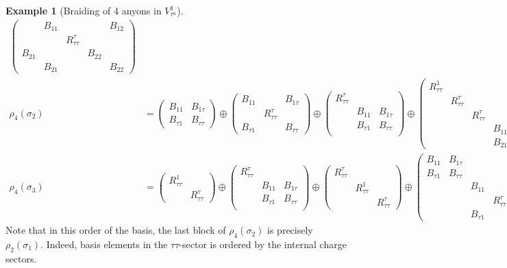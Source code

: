 \documentclass[a4paper,10pt,oneside]{book}
\theoremstyle{plain}
\theoremstyle{definition}
\newtheorem{example}{Example}[section]
\theoremstyle{remark}
\begin{document}
\begin{example}[Braiding of 4 anyons in $V_{τ^n}^1$]
{\begin{align*}
\begin{pmatrix}
             & B_{11}            &                   &        & B_{12} \\
             &                   & R_{ττ}^τ \\
      B_{21} &                   &                   & B_{22} & \\
             & B_{21}            &                   &        & B_{22}
    \end{pmatrix} \\
    ρ_4(σ_2) &=
    \begin{pmatrix}
      B_{11} & B_{1τ} \\
      B_{τ1} & B_{ττ}
    \end{pmatrix}
    \oplus
    \begin{pmatrix}
      B_{11} & & B_{1τ} \\
      & R_{ττ}^τ \\
      B_{τ1} & & B_{ττ}
    \end{pmatrix}
    \oplus
    \begin{pmatrix}
      R_{ττ}^τ \\
      & B_{11} & B_{1τ} \\
      & B_{τ1} & B_{ττ} \\
    \end{pmatrix}
    \oplus
    \begin{pmatrix}
      R_{ττ}^1 \\
      & R_{ττ}^τ \\
      & & R_{ττ}^τ \\
      & & & B_{11} & B_{12} \\
      & & & B_{21} & B_{22}
    \end{pmatrix} \\
    ρ_4(σ_3) &=
    \begin{pmatrix}
      R_{ττ}^1 \\
      & R_{ττ}^τ
    \end{pmatrix}
    \oplus
    \begin{pmatrix}
      R_{ττ}^τ \\
      & B_{11} & B_{1τ} \\
      & B_{τ1} & B_{ττ} \\
    \end{pmatrix}
    \oplus
    \begin{pmatrix}
      R_{ττ}^τ \\
      & R_{ττ}^1 \\
      & & R_{ττ}^τ
    \end{pmatrix}
    \oplus
    \begin{pmatrix}
      B_{11} & B_{1τ} \\
      B_{τ1} & B_{ττ} \\
      & & B_{11} & & B_{1τ} \\
      & & & R_{ττ}^τ \\
      & & B_{τ1} & & B_{ττ}
    \end{pmatrix}
  \end{align*}}
  Note that in this order of the basis, the last block of $ρ_{4}(σ_2)$ is precisely $ρ_2(σ_1)$. Indeed, basis elements in the $ττ$-sector is ordered by the internal charge sectors.
\end{example}
\end{document}
